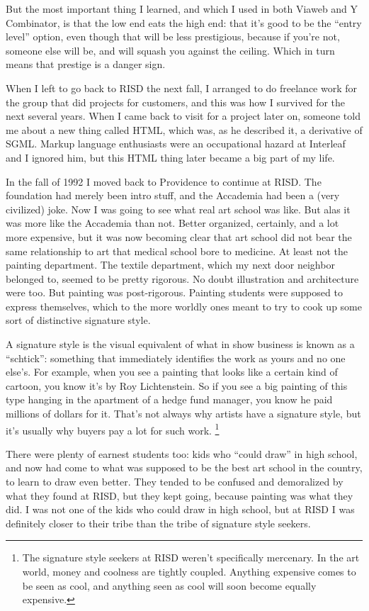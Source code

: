 \documentclass[12pt]{book}
\begin{document}
But the most important thing I learned, and which I used in both Viaweb
and Y Combinator, is that the low end eats the high end: that it's good
to be the ``entry level'' option, even though that will be less
prestigious, because if you're not, someone else will be, and will
squash you against the ceiling. Which in turn means that prestige is a
danger sign.

When I left to go back to RISD the next fall, I arranged to do freelance
work for the group that did projects for customers, and this was how I
survived for the next several years. When I came back to visit for a
project later on, someone told me about a new thing called HTML, which
was, as he described it, a derivative of SGML. Markup language
enthusiasts were an occupational hazard at Interleaf and I ignored him,
but this HTML thing later became a big part of my life.

In the fall of 1992 I moved back to Providence to continue at RISD. The
foundation had merely been intro stuff, and the Accademia had been a
(very civilized) joke. Now I was going to see what real art school was
like. But alas it was more like the Accademia than not. Better
organized, certainly, and a lot more expensive, but it was now becoming
clear that art school did not bear the same relationship to art that
medical school bore to medicine. At least not the painting department.
The textile department, which my next door neighbor belonged to, seemed
to be pretty rigorous. No doubt illustration and architecture were too.
But painting was post-rigorous. Painting students were supposed to
express themselves, which to the more worldly ones meant to try to cook
up some sort of distinctive signature style.

A signature style is the visual equivalent of what in show business is
known as a ``schtick'': something that immediately identifies the work
as yours and no one else's. For example, when you see a painting that
looks like a certain kind of cartoon, you know it's by Roy Lichtenstein.
So if you see a big painting of this type hanging in the apartment of a
hedge fund manager, you know he paid millions of dollars for it. That's
not always why artists have a signature style, but it's usually why
buyers pay a lot for such work. \footnote{The signature style seekers at RISD weren't specifically
mercenary. In the art world, money and coolness are tightly coupled.
Anything expensive comes to be seen as cool, and anything seen as cool
will soon become equally expensive.}

There were plenty of earnest students too: kids who ``could draw'' in
high school, and now had come to what was supposed to be the best art
school in the country, to learn to draw even better. They tended to be
confused and demoralized by what they found at RISD, but they kept
going, because painting was what they did. I was not one of the kids who
could draw in high school, but at RISD I was definitely closer to their
tribe than the tribe of signature style seekers.
\end{document}
